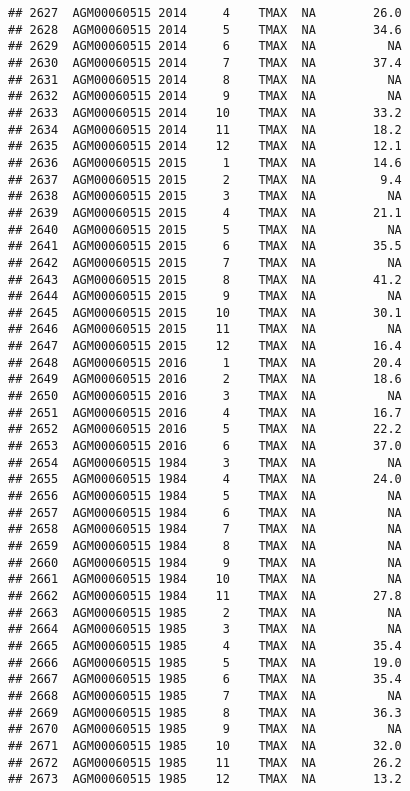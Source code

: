 \documentclass{article}\usepackage[]{graphicx}\usepackage[]{color}
\makeatletter
\newenvironment{kframe}{%
 \def\at@end@of@kframe{}%
 \ifinner\ifhmode%
  \def\at@end@of@kframe{\end{minipage}}%
  \begin{minipage}{\columnwidth}%
 \fi\fi%
 \def\FrameCommand##1{\hskip\@totalleftmargin \hskip-\fboxsep
 \colorbox{shadecolor}{##1}\hskip-\fboxsep
     \hskip-\linewidth \hskip-\@totalleftmargin \hskip\columnwidth}%
 \MakeFramed {\advance\hsize-\width
   \@totalleftmargin\z@ \linewidth\hsize
   \@setminipage}}%
 {\par\unskip\endMakeFramed%
 \at@end@of@kframe}
\newenvironment{knitrout}{}{} %
\makeatother
\begin{document}
\begin{knitrout}
\begin{kframe}
\begin{verbatim}
## 2627  AGM00060515 2014     4    TMAX  NA        26.0
## 2628  AGM00060515 2014     5    TMAX  NA        34.6
## 2629  AGM00060515 2014     6    TMAX  NA          NA
## 2630  AGM00060515 2014     7    TMAX  NA        37.4
## 2631  AGM00060515 2014     8    TMAX  NA          NA
## 2632  AGM00060515 2014     9    TMAX  NA          NA
## 2633  AGM00060515 2014    10    TMAX  NA        33.2
## 2634  AGM00060515 2014    11    TMAX  NA        18.2
## 2635  AGM00060515 2014    12    TMAX  NA        12.1
## 2636  AGM00060515 2015     1    TMAX  NA        14.6
## 2637  AGM00060515 2015     2    TMAX  NA         9.4
## 2638  AGM00060515 2015     3    TMAX  NA          NA
## 2639  AGM00060515 2015     4    TMAX  NA        21.1
## 2640  AGM00060515 2015     5    TMAX  NA          NA
## 2641  AGM00060515 2015     6    TMAX  NA        35.5
## 2642  AGM00060515 2015     7    TMAX  NA          NA
## 2643  AGM00060515 2015     8    TMAX  NA        41.2
## 2644  AGM00060515 2015     9    TMAX  NA          NA
## 2645  AGM00060515 2015    10    TMAX  NA        30.1
## 2646  AGM00060515 2015    11    TMAX  NA          NA
## 2647  AGM00060515 2015    12    TMAX  NA        16.4
## 2648  AGM00060515 2016     1    TMAX  NA        20.4
## 2649  AGM00060515 2016     2    TMAX  NA        18.6
## 2650  AGM00060515 2016     3    TMAX  NA          NA
## 2651  AGM00060515 2016     4    TMAX  NA        16.7
## 2652  AGM00060515 2016     5    TMAX  NA        22.2
## 2653  AGM00060515 2016     6    TMAX  NA        37.0
## 2654  AGM00060515 1984     3    TMAX  NA          NA
## 2655  AGM00060515 1984     4    TMAX  NA        24.0
## 2656  AGM00060515 1984     5    TMAX  NA          NA
## 2657  AGM00060515 1984     6    TMAX  NA          NA
## 2658  AGM00060515 1984     7    TMAX  NA          NA
## 2659  AGM00060515 1984     8    TMAX  NA          NA
## 2660  AGM00060515 1984     9    TMAX  NA          NA
## 2661  AGM00060515 1984    10    TMAX  NA          NA
## 2662  AGM00060515 1984    11    TMAX  NA        27.8
## 2663  AGM00060515 1985     2    TMAX  NA          NA
## 2664  AGM00060515 1985     3    TMAX  NA          NA
## 2665  AGM00060515 1985     4    TMAX  NA        35.4
## 2666  AGM00060515 1985     5    TMAX  NA        19.0
## 2667  AGM00060515 1985     6    TMAX  NA        35.4
## 2668  AGM00060515 1985     7    TMAX  NA          NA
## 2669  AGM00060515 1985     8    TMAX  NA        36.3
## 2670  AGM00060515 1985     9    TMAX  NA          NA
## 2671  AGM00060515 1985    10    TMAX  NA        32.0
## 2672  AGM00060515 1985    11    TMAX  NA        26.2
## 2673  AGM00060515 1985    12    TMAX  NA        13.2

\end{verbatim}
\end{kframe}
\end{knitrout}
\end{document}
